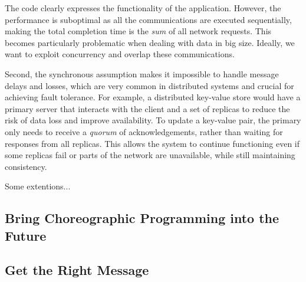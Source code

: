 \noindent The code clearly expresses the functionality of the application.
%
However, the performance is suboptimal as all the communications are executed sequentially, making the total completion time is the \emph{sum} of all network requests.
%
This becomes particularly problematic when dealing with data in big size.
%
Ideally, we want to exploit concurrency and overlap these communications.

Second, the synchronous assumption makes it impossible to handle message delays and losses, which are very common in distributed systems and crucial for achieving fault tolerance.
%
For example, a distributed key-value store would have a primary server that interacts with the client and a set of replicas to reduce the risk of data loss and improve availability.
%
To update a key-value pair, the primary only needs to receive a \emph{quorum} of acknowledgements, rather than waiting for responses from all replicas.
%
This allows the system to continue functioning even if some replicas fail or parts of the network are unavailable, while still maintaining consistency.

Some extentions...

\subsection{Bring Choreographic Programming into the Future}

\subsection{Get the Right Message}
